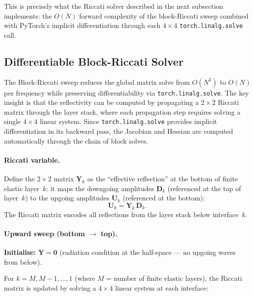 \documentclass[11pt,a4paper]{article}
\theoremstyle{plain}
\theoremstyle{remark}
\begin{document}
\noindent This is precisely what the Riccati solver described in the
next subsection implements: the $O(N)$ forward complexity of the
block-Riccati sweep combined with PyTorch's implicit differentiation
through each $4\times 4$ \texttt{torch.linalg.solve} call.

\subsection{Differentiable Block-Riccati Solver}\label{sec:diff-riccati}

The Block-Riccati sweep reduces the global matrix solve from $O(N^3)$
to $O(N)$ per frequency while preserving differentiability via
\texttt{torch.linalg.solve}.  The key insight is that the reflectivity
can be computed by propagating a $2\times 2$ Riccati matrix through the
layer stack, where each propagation step requires solving a single
$4\times 4$ linear system.  Since \texttt{torch.linalg.solve} provides
implicit differentiation in its backward pass, the Jacobian and Hessian
are computed automatically through the chain of block solves.

\paragraph{Riccati variable.}
Define the $2\times 2$ matrix $\mathbf{Y}_k$ as the ``effective
reflection'' at the bottom of finite elastic layer~$k$: it maps the
downgoing amplitudes $\mathbf{D}_k$ (referenced at the top of layer~$k$)
to the upgoing amplitudes $\mathbf{U}_k$ (referenced at the bottom):
\begin{equation}\label{eq:riccati-var}
  \mathbf{U}_k = \mathbf{Y}_k\,\mathbf{D}_k.
\end{equation}
The Riccati matrix encodes all reflections from the layer stack below
interface~$k$.

\paragraph{Upward sweep (bottom $\to$ top).}
\textbf{Initialise:} $\mathbf{Y} = \mathbf{0}$ (radiation condition at
the half-space --- no upgoing waves from below).

\medskip\noindent
For $k = M, M{-}1, \dotsc, 1$ (where $M$ = number of finite elastic
layers), the Riccati matrix is updated by solving a $4\times 4$ linear
system at each interface:
\end{document}
